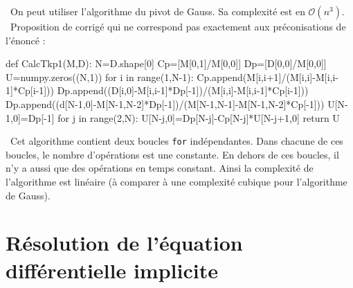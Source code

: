 \ifprof
\begin{corrige}\question\
On peut utiliser l'algorithme du pivot de Gauss. Sa complexité est en $\mathcal{O}(n^3)$.\\

\question\
Proposition de corrigé qui ne correspond pas exactement aux préconisations de l'énoncé :

\begin{python}
def CalcTkp1(M,D):
    N=D.shape[0]
    Cp=[M[0,1]/M[0,0]]
    Dp=[D[0,0]/M[0,0]]
    U=numpy.zeros((N,1))
    for i in range(1,N-1):
        Cp.append(M[i,i+1]/(M[i,i]-M[i,i-1]*Cp[i-1]))
        Dp.append((D[i,0]-M[i,i-1]*Dp[-1])/(M[i,i]-M[i,i-1]*Cp[i-1]))
    Dp.append((d[N-1,0]-M[N-1,N-2]*Dp[-1])/(M[N-1,N-1]-M[N-1,N-2]*Cp[-1]))
    U[N-1,0]=Dp[-1]
    for j in range(2,N):
        U[N-j,0]=Dp[N-j]-Cp[N-j]*U[N-j+1,0]
    return U
\end{python}

\question\
Cet algorithme contient deux boucles \texttt{for} indépendantes. Dans chacune de ces boucles, le nombre d'opérations 
est une constante. En dehors de ces boucles, il n'y a aussi que des opérations en temps constant. Ainsi la complexité 
de l'algorithme est linéaire (à comparer à une complexité cubique pour l'algorithme de Gauss).
\end{corrige}
\else
\fi


\section{Résolution de l'équation différentielle implicite}

